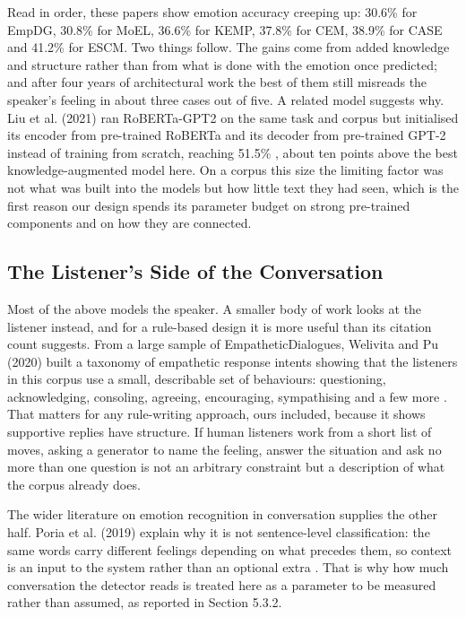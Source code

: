 Read in order, these papers show emotion accuracy creeping up: 30.6\% for EmpDG, 30.8\% for MoEL, 36.6\% for KEMP, 37.8\% for CEM, 38.9\% for CASE and 41.2\% for ESCM. Two things follow. The gains come from added knowledge and structure rather than from what is done with the emotion once predicted; and after four years of architectural work the best of them still misreads the speaker's feeling in about three cases out of five. A related model suggests why. Liu et al. (2021) ran RoBERTa-GPT2 on the same task and corpus but initialised its encoder from pre-trained RoBERTa and its decoder from pre-trained GPT-2 instead of training from scratch, reaching 51.5\% \cite{liu2021robertagpt2}, about ten points above the best knowledge-augmented model here. On a corpus this size the limiting factor was not what was built into the models but how little text they had seen, which is the first reason our design spends its parameter budget on strong pre-trained components and on how they are connected.

\subsection{The Listener's Side of the Conversation}
\label{sec:2.2.3}

Most of the above models the speaker. A smaller body of work looks at the listener instead, and for a rule-based design it is more useful than its citation count suggests. From a large sample of EmpatheticDialogues, Welivita and Pu (2020) built a taxonomy of empathetic response intents showing that the listeners in this corpus use a small, describable set of behaviours: questioning, acknowledging, consoling, agreeing, encouraging, sympathising and a few more \cite{welivita2020}. That matters for any rule-writing approach, ours included, because it shows supportive replies have structure. If human listeners work from a short list of moves, asking a generator to name the feeling, answer the situation and ask no more than one question is not an arbitrary constraint but a description of what the corpus already does.

The wider literature on emotion recognition in conversation supplies the other half. Poria et al. (2019) explain why it is not sentence-level classification: the same words carry different feelings depending on what precedes them, so context is an input to the system rather than an optional extra \cite{poria2019erc}. That is why how much conversation the detector reads is treated here as a parameter to be measured rather than assumed, as reported in Section 5.3.2.

